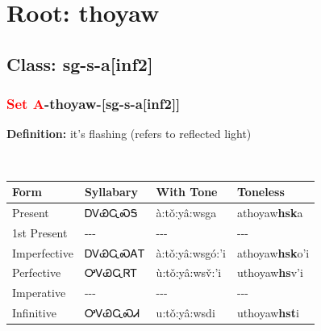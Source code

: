 \needspace{4in}
\section*{Root: thoyaw}
\nopagebreak
{}
\needspace{3in}
\subsection*{Class: sg-s-a[inf2]}
\nopagebreak
\needspace{2in}
\subsubsection*{\textcolor{Red}{Set A}{-}\textbf{thoyaw}{-}[sg-s-a[inf2]]}
\nopagebreak
\textbf{Definition: } it{\textquoteright}s flashing (refers to reflected light)
\\[0.5em]
\begin{tabularx}{\textwidth}{l X X X}%
\toprule%
\textbf{Form}&\textbf{Syllabary}&\textbf{With Tone}&\textbf{Toneless}\\%
\midrule%
Present&ᎠᏙᏯᏩᏍᎦ&à:tǒ:yâ:wsga&athoyaw\textbf{hsk}a\\%
1st Present&{-}{-}{-}&{-}{-}{-}&{-}{-}{-}\\%
Imperfective&ᎠᏙᏯᏩᏍᎪᎢ&à:tǒ:yâ:wsgó:’i&athoyaw\textbf{hsk}o'i\\%
Perfective&ᎤᏙᏯᏩᏒᎢ&ù:tǒ:yâ:wsv̌:’i&uthoyaw\textbf{hs}v'i\\%
Imperative&{-}{-}{-}&{-}{-}{-}&{-}{-}{-}\\%
Infinitive&ᎤᏙᏯᏩᏍᏗ&u:tǒ:yâ:wsdi&uthoyaw\textbf{hst}i\\%
\bottomrule%
\end{tabularx}
\\[1em]